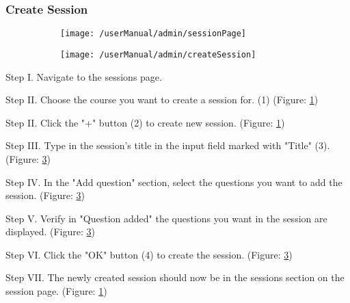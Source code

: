 \subsubsection{Create Session}

\begin{figure}[H]
	\begin{subfigure}{0.80\linewidth}
		\texttt{[image: /userManual/admin/sessionPage]}
		\caption{}
		\label{fig:sessionPage}
	\end{subfigure}
	\begin{subfigure}{0.70\linewidth}
		\texttt{[image: /userManual/admin/createSession]}
		\caption{}
		\label{fig:createSession}
	\end{subfigure}
\end{figure}

\begin{userManualItemlist}
	\item[Step I.] Navigate to the sessions page.
	\item[Step II.] Choose the course you want to create a session for. (1) (Figure: \ref{fig:sessionPage})
	\item[Step II.] Click the "+" button (2) to create new session. (Figure: \ref{fig:sessionPage})
	\item[Step III.] Type in the session's title in the input field marked with "Title" (3). (Figure: \ref{fig:createSession})
	\item[Step IV.] In the "Add question" section, select the questions you want to add the session. (Figure: \ref{fig:createSession})
	\item[Step V.] Verify in "Question added" the questions you want in the session are displayed. (Figure: \ref{fig:createSession})
	\item[Step VI.] Click the "OK" button (4) to create the session. (Figure: \ref{fig:createSession})
	\item[Step VII.] The newly created session should now be in the sessions section on the session page. (Figure: \ref{fig:sessionPage})
\end{userManualItemlist}